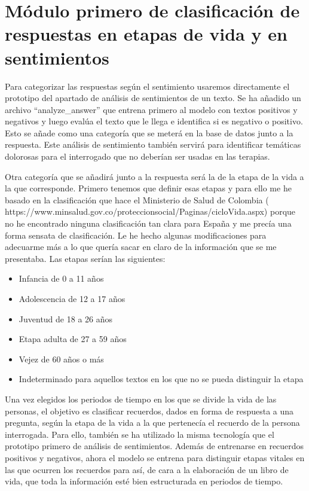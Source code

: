 \section{Módulo primero de clasificación de respuestas en etapas de vida y en sentimientos}

Para categorizar las respuestas según el sentimiento usaremos directamente el prototipo del apartado de análisis de sentimientos de un texto. Se ha añadido un archivo ``analyze\_answer'' que entrena primero al modelo con textos positivos y negativos y luego evalúa el texto que le llega e identifica si es negativo o positivo. Esto se añade como una categoría que se meterá en la base de datos junto a la respuesta. Este análisis de sentimiento también servirá para identificar temáticas dolorosas para el interrogado que no deberían ser usadas en las terapias. 

Otra categoría que se añadirá junto a la respuesta será la de la etapa de la vida a la que corresponde. Primero tenemos que definir esas etapas y para ello me he basado en la clasificación que hace el Ministerio de Salud de Colombia ( https://www.minsalud.gov.co/proteccionsocial/Paginas/cicloVida.aspx) porque no he encontrado ninguna clasificación tan clara para España y me precía una forma sensata de clasificación. Le he hecho algunas modificaciones para adecuarme más a lo que quería sacar en claro de la información que se me presentaba. Las etapas serían las siguientes:
\begin{itemize}
	\item Infancia de 0 a 11 años
	\item Adolescencia de 12 a 17 años
	\item Juventud de 18 a 26 años
	\item Etapa adulta de 27 a 59 años
	\item Vejez de 60 años o más
	\item Indeterminado para aquellos textos en los que no se pueda distinguir la etapa
\end{itemize}

Una vez elegidos los periodos de tiempo en los que se divide la vida de las personas, el objetivo es clasificar recuerdos, dados en forma de respuesta a una pregunta, según la etapa de la vida a la que pertenecía el recuerdo de la persona interrogada. Para ello, también se ha utilizado la misma tecnología que el prototipo primero de análisis de sentimientos. Además de entrenarse en recuerdos positivos y negativos, ahora el modelo se entrena para distinguir etapas vitales en las que ocurren los recuerdos para así, de cara a la elaboración de un libro de vida, que toda la información esté bien estructurada en periodos de tiempo. 




